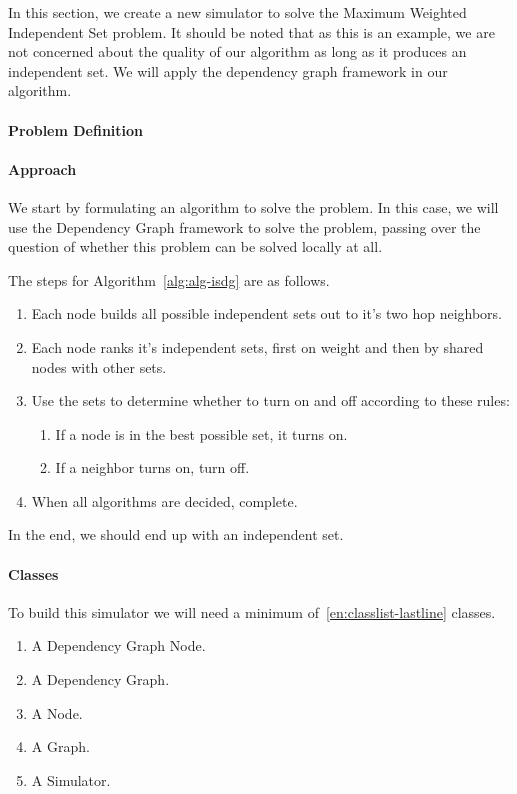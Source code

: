 In this section, we create a new simulator to solve the Maximum Weighted Independent Set problem. It should be noted that as this is an example, we are not concerned about the quality of our algorithm as long as it produces an independent set. We will apply the dependency graph framework in our algorithm.

\paragraph{Problem Definition}


\paragraph{Approach}

We start by formulating an algorithm to solve the problem. In this case, we will use the Dependency Graph framework to solve the problem, passing over the question of whether this problem can be solved locally at all.

The steps for Algorithm~\ref{alg:alg-isdg} are as follows.

\begin{enumerate}
\item Each node builds all possible independent sets out to it's two hop neighbors.
\item Each node ranks it's independent sets, first on weight and then by shared nodes with other sets.
\item Use the sets to determine whether to turn on and off according to these rules:
\begin{enumerate}
\item If a node is in the best possible set, it turns on.
\item If a neighbor turns on, turn off.
\end{enumerate}
\item When all algorithms are decided, complete.
\end{enumerate}

In the end, we should end up with an independent set.

\paragraph{Classes}

To build this simulator we will need a minimum of~\ref{en:classlist-lastline} classes.
\begin{enumerate}
\item A Dependency Graph Node.
\item A Dependency Graph.
\item A Node.
\item A Graph.
\item A Simulator.\label{en:classlist-lastline}
\end{enumerate}

